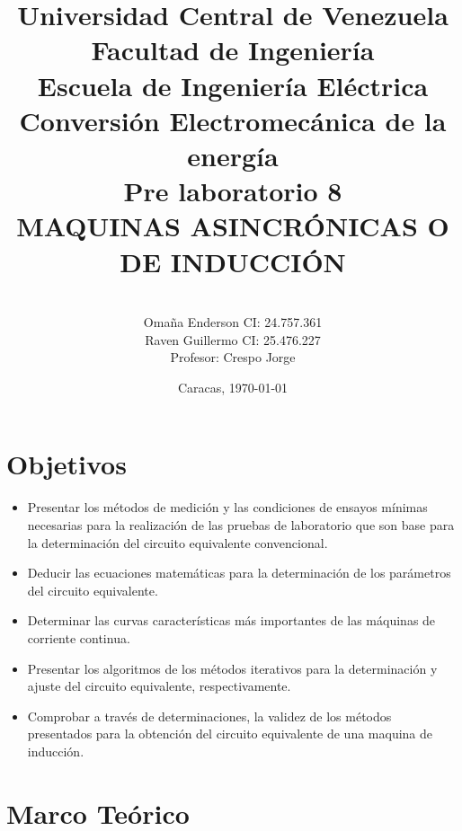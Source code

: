 \documentclass[11pt,letterpaper]{article}     %
\author{\\Omaña Enderson CI:  24.757.361 \\Raven Guillermo CI: 25.476.227\\Profesor: Crespo Jorge \vspace*{1in}}
\title{Universidad Central de Venezuela\\{ Facultad de Ingeniería\\Escuela de Ingeniería Eléctrica\\ Conversión Electromecánica de la energía\\\vspace*{1.5in} }Pre laboratorio 8\\MAQUINAS ASINCRÓNICAS O DE INDUCCIÓN\vspace*{1.35in}}
\date{Caracas, \today}
\begin{document}
\maketitle							%
\newpage
\tableofcontents
\newpage
\section{Objetivos}
\begin{itemize}
	\item Presentar los métodos de medición y las condiciones de ensayos mínimas necesarias para la realización de las pruebas de laboratorio que son base para la determinación del circuito equivalente convencional.
	\item Deducir las ecuaciones matemáticas para la determinación de los parámetros del circuito equivalente.
	\item Determinar las curvas características más importantes de las máquinas de corriente continua.
    \item Presentar los algoritmos de los métodos iterativos para la determinación y ajuste del circuito equivalente, respectivamente.
    \item Comprobar a través de determinaciones, la validez de los métodos presentados para la obtención del circuito equivalente de una maquina de inducción.
\end{itemize}
\section{Marco Teórico}
\end{document}
